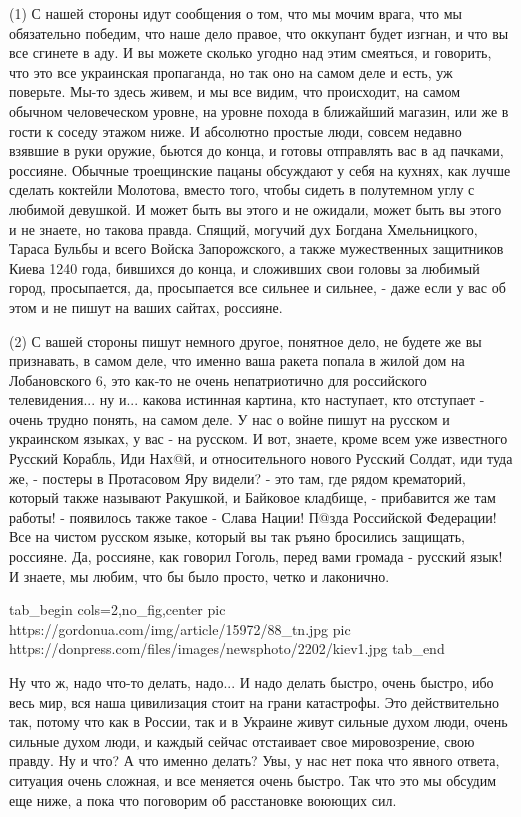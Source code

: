(1) С нашей стороны идут сообщения о том, что мы мочим врага, что мы
обязательно победим, что наше дело правое, что оккупант будет изгнан, и что вы
все сгинете в аду. И вы можете сколько угодно над этим смеяться, и говорить,
что это все украинская пропаганда, но так оно на самом деле и есть, уж
поверьте.  Мы-то здесь живем, и мы все видим, что происходит, на самом обычном
человеческом уровне, на уровне похода в ближайший магазин, или же в гости к
соседу этажом ниже. И абсолютно простые люди, совсем недавно взявшие в руки
оружие, бьются до конца, и готовы отправлять вас в ад пачками, россияне.
Обычные троещинские пацаны обсуждают у себя на кухнях, как лучше сделать
коктейли Молотова, вместо того, чтобы сидеть в полутемном углу с любимой
девушкой. И может быть вы этого и не ожидали, может быть вы этого и не знаете,
но такова правда.  Спящий, могучий дух Богдана Хмельницкого, Тараса Бульбы и
всего Войска Запорожского, а также мужественных защитников Киева 1240 года,
бившихся до конца, и сложивших свои головы за любимый город, просыпается, да,
просыпается все сильнее и сильнее, - даже если у вас об этом и не пишут на
ваших сайтах, россияне.

(2) С вашей стороны пишут немного другое, понятное дело, не будете же вы
признавать, в самом деле, что именно ваша ракета попала в жилой дом на
Лобановского 6, это как-то не очень непатриотично для российского
телевидения... ну и... какова истинная картина, кто наступает, кто отступает -
очень трудно понять, на самом деле. У нас о войне пишут на русском и украинском
языках, у вас - на русском. И вот, знаете, кроме всем уже известного Русский
Корабль, Иди Нах@й, и относительного нового Русский Солдат, иди туда же, -
постеры в Протасовом Яру видели? - это там, где рядом крематорий, который также
называют Ракушкой, и Байковое кладбище, - прибавится же там работы! - появилось
также такое - Слава Нации! П@зда Российской Федерации! Все на чистом русском
языке, который вы так ръяно бросились защищать, россияне. Да, россияне, как
говорил Гоголь, перед вами громада - русский язык! И знаете, мы любим, что бы
было просто, четко и лаконично.

\ifcmt
  tab_begin cols=2,no_fig,center
     pic https://gordonua.com/img/article/15972/88_tn.jpg
		 pic https://donpress.com/files/images/newsphoto/2202/kiev1.jpg
  tab_end
\fi

Ну что ж, надо что-то делать, надо... И надо делать быстро, очень быстро, ибо
весь мир, вся наша цивилизация стоит на грани катастрофы. Это действительно
так, потому что как в России, так и в Украине живут сильные духом люди, очень
сильные духом люди, и каждый сейчас отстаивает свое мировозрение, свою правду.
Ну и что? А что именно делать? Увы, у нас нет пока что явного ответа, ситуация
очень сложная, и все меняется очень быстро. Так что это мы обсудим еще ниже, а
пока что поговорим об расстановке воюющих сил.

